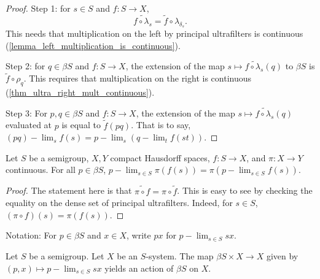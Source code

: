 \begin{proof}
\leanok{}
    
    Step 1: for $s \in S$ and $f: S \to X$,
    \[\widetilde{f \circ \lambda_s} = \tilde f \circ \lambda_{\delta_s}.\]
    This needs that multiplication on the left by principal ultrafilters is continuous (\cref{lemma_left_multiplication_is_continuous}).

    Step 2: for $q \in \beta S$ and $f: S \to X$, the extension of the map $s \mapsto \widetilde{f \circ \lambda_s}(q)$ to $\beta S$ is $\tilde f \circ \rho_q$. This requires that multiplication on the right is continuous (\cref{thm_ultra_right_mult_continuous}).

    Step 3: For $p, q \in \beta S$ and $f: S \to X$, the extension of the map $s \mapsto \widetilde{f \circ \lambda_s}(q)$ evaluated at $p$ is equal to $\tilde f(pq)$.  That is to say, $(pq)-\lim_s f(s) = p-\lim_s (q-\lim_t f(st))$.
\end{proof}

\begin{theorem}
\label{thm_continuity_and_plim}
\leanok{}
    Let $S$ be a semigroup, $X, Y$ compact Hausdorff spaces, $f: S \to X$, and $\pi: X \to Y$ continuous.  For all $p \in \beta S$, $p-\lim_{s \in S} \pi (f (s)) = \pi (p-\lim_{s \in S} f (s))$.
\end{theorem}

\begin{proof}
\leanok{}
    The statement here is that $\widetilde {\pi \circ f} = \pi \circ \tilde f$.  This is easy to see by checking the equality on the dense set of principal ultrafilters.  Indeed, for $s \in S$, $(\pi \circ f)(s) = \pi(f(s))$.
\end{proof}

Notation: For $p \in \beta S$ and $x \in X$, write $px$ for $p-\lim_{s \in S} sx$.

\begin{theorem}
\label{thm_ultra_semigroup_action}
\leanok{}
    Let $S$ be a semigroup. Let $X$ be an $S$-system.  The map $\beta S \times X \to X$ given by $(p,x) \mapsto p-\lim_{s \in S} sx$ yields an action of $\beta S$ on $X$.
\end{theorem}

